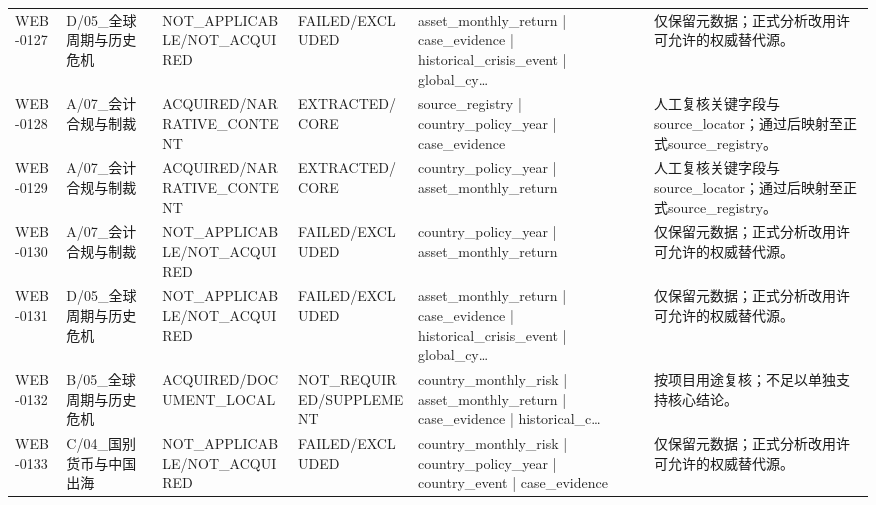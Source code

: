 \begin{landscape}
\begin{longtable}{p{1.8cm}p{2.6cm}p{2.6cm}p{2.6cm}p{4.8cm}p{7.2cm}}
WEB-0127 & D/\allowbreak{}05\_\allowbreak{}全球周期与历史危机 & NOT\_\allowbreak{}APPLICABLE/\allowbreak{}NOT\_\allowbreak{}ACQUIRED & FAILED/\allowbreak{}EXCLUDED & asset\_\allowbreak{}monthly\_\allowbreak{}return | case\_\allowbreak{}evidence | historical\_\allowbreak{}crisis\_\allowbreak{}event | global\_\allowbreak{}cy… & 仅保留元数据；正式分析改用许可允许的权威替代源。\\
WEB-0128 & A/\allowbreak{}07\_\allowbreak{}会计合规与制裁 & ACQUIRED/\allowbreak{}NARRATIVE\_\allowbreak{}CONTENT & EXTRACTED/\allowbreak{}CORE & source\_\allowbreak{}registry | country\_\allowbreak{}policy\_\allowbreak{}year | case\_\allowbreak{}evidence & 人工复核关键字段与source\_\allowbreak{}locator；通过后映射至正式source\_\allowbreak{}registry。\\
WEB-0129 & A/\allowbreak{}07\_\allowbreak{}会计合规与制裁 & ACQUIRED/\allowbreak{}NARRATIVE\_\allowbreak{}CONTENT & EXTRACTED/\allowbreak{}CORE & country\_\allowbreak{}policy\_\allowbreak{}year | asset\_\allowbreak{}monthly\_\allowbreak{}return & 人工复核关键字段与source\_\allowbreak{}locator；通过后映射至正式source\_\allowbreak{}registry。\\
WEB-0130 & A/\allowbreak{}07\_\allowbreak{}会计合规与制裁 & NOT\_\allowbreak{}APPLICABLE/\allowbreak{}NOT\_\allowbreak{}ACQUIRED & FAILED/\allowbreak{}EXCLUDED & country\_\allowbreak{}policy\_\allowbreak{}year | asset\_\allowbreak{}monthly\_\allowbreak{}return & 仅保留元数据；正式分析改用许可允许的权威替代源。\\
WEB-0131 & D/\allowbreak{}05\_\allowbreak{}全球周期与历史危机 & NOT\_\allowbreak{}APPLICABLE/\allowbreak{}NOT\_\allowbreak{}ACQUIRED & FAILED/\allowbreak{}EXCLUDED & asset\_\allowbreak{}monthly\_\allowbreak{}return | case\_\allowbreak{}evidence | historical\_\allowbreak{}crisis\_\allowbreak{}event | global\_\allowbreak{}cy… & 仅保留元数据；正式分析改用许可允许的权威替代源。\\
WEB-0132 & B/\allowbreak{}05\_\allowbreak{}全球周期与历史危机 & ACQUIRED/\allowbreak{}DOCUMENT\_\allowbreak{}LOCAL & NOT\_\allowbreak{}REQUIRED/\allowbreak{}SUPPLEMENT & country\_\allowbreak{}monthly\_\allowbreak{}risk | asset\_\allowbreak{}monthly\_\allowbreak{}return | case\_\allowbreak{}evidence | historical\_\allowbreak{}c… & 按项目用途复核；不足以单独支持核心结论。\\
WEB-0133 & C/\allowbreak{}04\_\allowbreak{}国别货币与中国出海 & NOT\_\allowbreak{}APPLICABLE/\allowbreak{}NOT\_\allowbreak{}ACQUIRED & FAILED/\allowbreak{}EXCLUDED & country\_\allowbreak{}monthly\_\allowbreak{}risk | country\_\allowbreak{}policy\_\allowbreak{}year | country\_\allowbreak{}event | case\_\allowbreak{}evidence & 仅保留元数据；正式分析改用许可允许的权威替代源。\\

\end{longtable}
\end{landscape}
